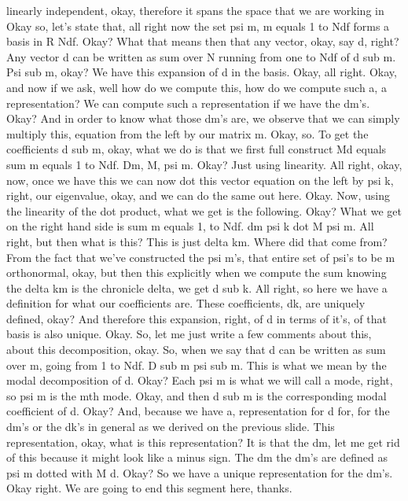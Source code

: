 \documentclass[10pt]{article}
\begin{document}
linearly independent, okay, therefore it spans the space that we are working in Okay so, let's state that, all right now the set psi m, m equals 1 to Ndf forms a basis in R Ndf. Okay? What that means then that any vector, okay, say d, right? Any vector d can be written as sum over N running from one to Ndf of d sub m. Psi sub m, okay? We have this expansion of d in the basis. Okay, all right. Okay, and now if we ask, well how do we compute this, how do we compute such a, a representation? We can compute such a representation if we have the dm's. Okay? And in order to know what those dm's are, we observe that we can simply multiply this, equation from the left by our matrix m. Okay, so. To get the coefficients d sub m, okay, what we do is that we first full construct Md equals sum m equals 1 to Ndf. Dm, M, psi m. Okay? Just using linearity. All right, okay, now, once we have this we can now dot this vector equation on the left by psi k, right, our eigenvalue, okay, and we can do the same out here. Okay. Now, using the linearity of the dot product, what we get is the following. Okay? What we get on the right hand side is sum m equals 1, to Ndf. dm psi k dot M psi m. All right, but then what is this? This is just delta km. Where did that come from? From the fact that we've constructed the psi m's, that entire set of psi's to be m orthonormal, okay, but then this explicitly when we compute the sum knowing the delta km is the chronicle delta, we get d sub k. All right, so here we have a definition for what our coefficients are. These coefficients, dk, are uniquely defined, okay? And therefore this expansion, right, of d in terms of it's, of that basis is also unique. Okay. So, let me just write a few comments about this, about this decomposition, okay. So, when we say that d can be written as sum over m, going from 1 to Ndf. D sub m psi sub m. This is what we mean by the modal decomposition of d. Okay? Each psi m is what we will call a mode, right, so psi m is the mth mode. Okay, and then d sub m is the corresponding modal coefficient of d. Okay? And, because we have a, representation for d for, for the dm's or the dk's in general as we derived on the previous slide. This representation, okay, what is this representation? It is that the dm, let me get rid of this because it might look like a minus sign. The dm the dm's are defined as psi m dotted with M d. Okay? So we have a unique representation for the dm's. Okay right. We are going to end this segment here, thanks.
\end{document}
